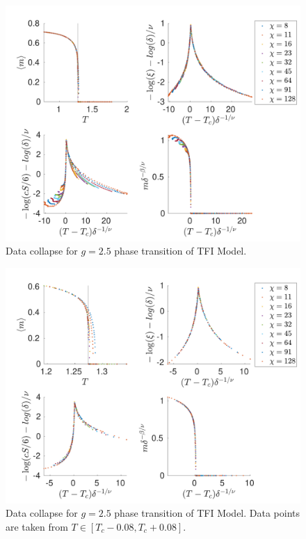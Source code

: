 \begin{figure}[h!]
    \center
    \includegraphics[width=\textwidth]{Figuren/phasediag/g25/Full.pdf}
    \caption{ Data collapse for $g=2.5$ phase transition of \Gls{TFI} Model. }
    \label{fig:phase:g25:full}
\end{figure}

\begin{figure}[h!]
    \center
    \includegraphics[width=\textwidth]{Figuren/phasediag/g25/zoomed.pdf}
    \caption{ Data collapse for $g=2.5$ phase transition of \Gls{TFI} Model. Data points are taken from $T \in \left[ T_c -0.08, T_c +0.08 \right]$. }
    \label{fig:phase:g25:zoomed}
\end{figure}

